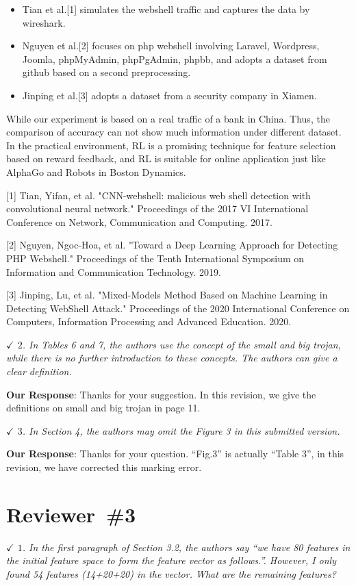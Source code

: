 \documentclass{amsart}
\theoremstyle{definition}
\theoremstyle{remark}
\numberwithin{equation}{section}
\begin{document}
\begin{itemize}
\item Tian et al.[1] simulates the webshell traffic and captures the data by wireshark.
\item Nguyen et al.[2] focuses on php webshell involving Laravel, Wordpress, Joomla, phpMyAdmin, phpPgAdmin, phpbb, and adopts a dataset from github based on a second preprocessing.
\item Jinping et al.[3] adopts a dataset from a security company in Xiamen.
\end{itemize}

While our experiment is based on a real traffic of a bank in China. Thus, the comparison of accuracy can not show much information under different dataset. In the practical environment, RL is a promising technique for feature selection based on reward feedback, and RL is suitable for online application just like AlphaGo and Robots in Boston Dynamics.


[1] Tian, Yifan, et al. "CNN-webshell: malicious web shell detection with convolutional neural network." Proceedings of the 2017 VI International Conference on Network, Communication and Computing. 2017.

[2] Nguyen, Ngoc-Hoa, et al. "Toward a Deep Learning Approach for Detecting PHP Webshell." Proceedings of the Tenth International Symposium on Information and Communication Technology. 2019.

[3] Jinping, Lu, et al. "Mixed-Models Method Based on Machine Learning in Detecting WebShell Attack." Proceedings of the 2020 International Conference on Computers, Information Processing and Advanced Education. 2020.



\emph{$\checkmark$ $2$. In Tables 6 and 7, the authors use the concept of the small and big trojan, while there is no further introduction to these concepts. The authors can give a clear definition.}

\textbf{Our Response}:
Thanks for your suggestion. In this revision, we give the definitions on small and big trojan in page 11. 


\emph{$\checkmark$ $3$. In Section 4, the authors may omit the Figure 3 in this submitted version.}

\textbf{Our Response}:
	Thanks for your question. ``Fig.3'' is actually ``Table 3'', in this revision, we have corrected this marking error.



\section*{Reviewer~\#3}
\emph{$\checkmark$ $1$. In the first paragraph of Section 3.2, the authors say “we have 80 features in the initial feature space to form the feature vector as follows.”. However, I only found 54 features (14+20+20) in the vector. What are the remaining features?}
\end{document}
